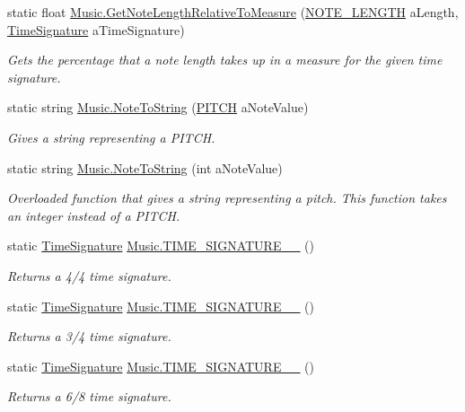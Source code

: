 \begin{DoxyCompactItemize}
static float \hyperlink{group___music_static_func_ga91e290b48ad2289493ba4421308abe49}{Music.\+Get\+Note\+Length\+Relative\+To\+Measure} (\hyperlink{group___music_enums_gaf11b5f079adbb21c800b9eca1c5c3cbd}{N\+O\+T\+E\+\_\+\+L\+E\+N\+G\+TH} a\+Length, \hyperlink{group___music_structs_struct_music_1_1_time_signature}{Time\+Signature} a\+Time\+Signature)
\begin{DoxyCompactList}\small\item\em Gets the percentage that a note length takes up in a measure for the given time signature. \end{DoxyCompactList}\item 
static string \hyperlink{group___music_static_func_ga85a22c905d56d4c5f4e62159bfecee8c}{Music.\+Note\+To\+String} (\hyperlink{group___music_enums_ga508f69b199ea518f935486c990edac1d}{P\+I\+T\+CH} a\+Note\+Value)
\begin{DoxyCompactList}\small\item\em Gives a string representing a P\+I\+T\+CH. \end{DoxyCompactList}\item 
static string \hyperlink{group___music_static_func_ga03f793951dcfe199532c9596cb539022}{Music.\+Note\+To\+String} (int a\+Note\+Value)
\begin{DoxyCompactList}\small\item\em Overloaded function that gives a string representing a pitch. This function takes an integer instead of a P\+I\+T\+CH. \end{DoxyCompactList}\item 
static \hyperlink{group___music_structs_struct_music_1_1_time_signature}{Time\+Signature} \hyperlink{group___music_static_func_gac95af323eef7511543c799154e1c29fd}{Music.\+T\+I\+M\+E\+\_\+\+S\+I\+G\+N\+A\+T\+U\+R\+E\+\_\+\_} ()
\begin{DoxyCompactList}\small\item\em Returns a 4/4 time signature. \end{DoxyCompactList}\item 
static \hyperlink{group___music_structs_struct_music_1_1_time_signature}{Time\+Signature} \hyperlink{group___music_static_func_ga0392e239cbd45a23e5f76f88d0b4c152}{Music.\+T\+I\+M\+E\+\_\+\+S\+I\+G\+N\+A\+T\+U\+R\+E\+\_\+\_} ()
\begin{DoxyCompactList}\small\item\em Returns a 3/4 time signature. \end{DoxyCompactList}\item 
static \hyperlink{group___music_structs_struct_music_1_1_time_signature}{Time\+Signature} \hyperlink{group___music_static_func_gabfda54cf40e32a4299de5a2fde753347}{Music.\+T\+I\+M\+E\+\_\+\+S\+I\+G\+N\+A\+T\+U\+R\+E\+\_\+\_} ()
\begin{DoxyCompactList}\small\item\em Returns a 6/8 time signature. \end{DoxyCompactList}\end{DoxyCompactItemize}


